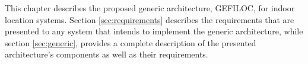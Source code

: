 \label{cap:architecture}

This chapter describes the proposed generic architecture, GEFILOC, for indoor location systems. Section \ref{sec:requirements} describes the requirements that are presented to any system that intends to implement the generic architecture, while section \ref{sec:generic}, provides a complete description of the presented architecture's components as well as their requirements.



\cleardoublepage
